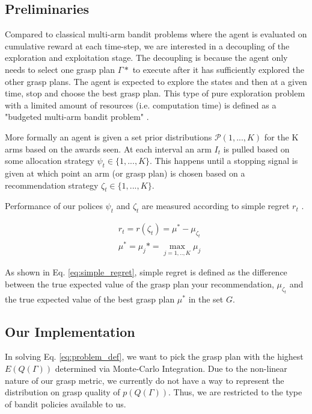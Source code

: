 \documentclass[letterpaper, 10 pt, conference]{ieeeconf}  %
\begin{document}
\subsection{Preliminaries}
Compared to classical multi-arm bandit problems where the agent is evaluated on cumulative reward at each time-step, we are interested in a decoupling of the exploration and exploitation stage. The decoupling is because the agent only needs to select one grasp plan $\Gamma*$ to execute after it has sufficiently explored the other grasp plans. The agent is expected to explore the states and then at a given time, stop and choose the best grasp plan. This type of pure exploration problem with a limited amount of resources (i.e. computation time) is defined as a "budgeted multi-arm bandit problem" \cite{madani2004budgeted}. 

More formally an agent is given a set prior distributions $\mathcal{P}(1,...,K)$ for the K arms based on the awards seen. At each interval an arm $I_t$ is pulled based on some allocation strategy $\psi_t \in \lbrace 1,...,K \rbrace$. This happens until a stopping signal is given at which point an arm (or grasp plan) is chosen based on a recommendation strategy $\zeta_t \in \lbrace 1,...,K \rbrace$. 

Performance of our polices $\psi_t$ and $\zeta_t$ are measured according to simple regret $r_t$ \cite{bubeck2009pure}. 

\vspace{-2ex}
\begin{align}\label{eq:simple_regret}
&r_t = r(\zeta_t) = \mu^* - \mu_{\zeta_t} \\
&\mu^* = \mu_j* = \max_{j=1,..,K} \mu_j
\end{align}

As shown in Eq. \ref{eq:simple_regret}, simple regret is defined as the difference between the true expected value of the grasp plan your recommendation, $\mu_{\zeta_t}$ and the true expected value of the best grasp plan $\mu^*$ in the set $G$. 

\subsection{Our Implementation}
In solving Eq. \ref{eq:problem_def}, we want to pick the grasp plan with the highest $E(Q(\Gamma))$ determined via Monte-Carlo Integration. Due to the non-linear nature of our grasp metric, we currently do not have a way to represent the distribution on grasp quality of $p(Q(\Gamma))$. Thus, we are restricted to the type of bandit policies available to us.
\end{document}

